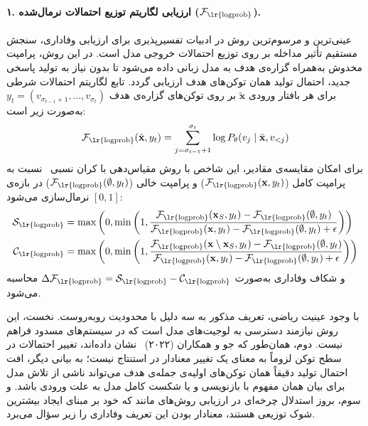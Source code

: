 \paragraph{۱. ارزیابی لگاریتم توزیع احتمالات نرمال‌شده ($\mathcal{F}_{\text{\lr{logprob}}}$).}
عینی‌ترین و مرسوم‌ترین روش در ادبیات تفسیرپذیری برای ارزیابی وفاداری، سنجش مستقیم تأثیر مداخله بر روی توزیع احتمالات خروجی مدل است. در این روش، پرامپت مخدوش به‌همراه گزاره‌ی هدف به مدل زبانی داده می‌شود تا بدون نیاز به تولید پاسخی جدید، احتمال تولید همان توکن‌های هدف ارزیابی گردد. تابع لگاریتم احتمالات شرطی برای هر بافتار ورودی $\tilde{\mathbf{x}}$ بر روی توکن‌های گزاره‌ی هدف $y_t = (v_{\sigma_{t-1}+1}, \dots, v_{\sigma_t})$ به‌صورت زیر است:
\begin{equation}
    \mathcal{F}_{\text{\lr{logprob}}}(\tilde{\mathbf{x}}, y_t) = \sum_{j=\sigma_{t-1}+1}^{\sigma_t} \log P_\theta(v_j \mid \tilde{\mathbf{x}}, v_{<j})
\end{equation}
برای امکان مقایسه‌ی مقادیر، این شاخص با روش مقیاس‌دهی با کران نسبی~\cite{carton2020evaluating} نسبت به پرامپت کامل ($\mathcal{F}_{\text{\lr{logprob}}}(\mathbf{x}, y_t)$) و پرامپت خالی ($\mathcal{F}_{\text{\lr{logprob}}}(\emptyset, y_t)$) در بازه‌ی $[0, 1]$ نرمال‌سازی می‌شود:
\begin{align}
    \mathcal{S}_{\text{\lr{logprob}}} &= \max\left(0, \min\left(1, \frac{\mathcal{F}_{\text{\lr{logprob}}}(\mathbf{x}_S, y_t) - \mathcal{F}_{\text{\lr{logprob}}}(\emptyset, y_t)}{\mathcal{F}_{\text{\lr{logprob}}}(\mathbf{x}, y_t) - \mathcal{F}_{\text{\lr{logprob}}}(\emptyset, y_t) + \epsilon}\right)\right) \\
    \mathcal{C}_{\text{\lr{logprob}}} &= \max\left(0, \min\left(1, \frac{\mathcal{F}_{\text{\lr{logprob}}}(\mathbf{x} \setminus \mathbf{x}_S, y_t) - \mathcal{F}_{\text{\lr{logprob}}}(\emptyset, y_t)}{\mathcal{F}_{\text{\lr{logprob}}}(\mathbf{x}, y_t) - \mathcal{F}_{\text{\lr{logprob}}}(\emptyset, y_t) + \epsilon}\right)\right)
\end{align}
و شکاف وفاداری به‌صورت $\Delta\mathcal{F}_{\text{\lr{logprob}}} = \mathcal{S}_{\text{\lr{logprob}}} - \mathcal{C}_{\text{\lr{logprob}}}$ محاسبه می‌شود.

با وجود عینیت ریاضی، تعریف مذکور به سه دلیل با محدودیت روبه‌روست. نخست، این روش نیازمند دسترسی به لوجیت‌های مدل است که در سیستم‌های مسدود فراهم نیست. دوم، همان‌طور که جو و همکاران (۲۰۲۲)~\cite{ju2022logictraps} نشان داده‌اند، تغییر احتمالات در سطح توکن لزوماً به معنای یک تغییر معنادار در استنتاج نیست؛ به بیانی دیگر، افت احتمال تولید دقیقاً همان توکن‌های اولیه‌ی جمله‌ی هدف می‌تواند ناشی از تلاش مدل برای بیان همان مفهوم با بازنویسی و یا شکست کامل مدل به علت ورودی  باشد. و سوم، بروز استدلال چرخه‌ای در ارزیابی روش‌های مانند  که خود بر مبنای ایجاد بیشترین شوک توزیعی هستند، معنادار بودن این تعریف وفاداری را زیر سؤال می‌برد.


